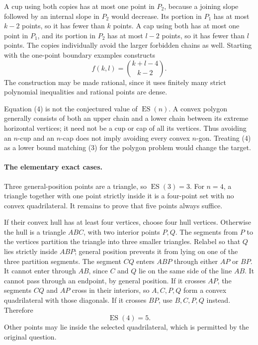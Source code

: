 \documentclass[11pt]{article}
\begin{document}
A cup using both copies has at most one point in $P_2$, because a
joining slope followed by an internal slope in $P_2$ would decrease.
Its portion in $P_1$ has at most $k-2$ points, so it has fewer than $k$
points. A cap using both has at most one point in $P_1$, and its portion
in $P_2$ has at most $l-2$ points, so it has fewer than $l$ points.
The copies individually avoid the larger forbidden chains as well.
Starting with the one-point boundary examples constructs
\[
                         f(k,l)=\binom{k+l-4}{k-2}.      \tag{4}
\]
The construction may be made rational, since it uses finitely many
strict polynomial inequalities and rational points are dense.

Equation (4) is not the conjectured value of $\operatorname{ES}(n)$.
A convex polygon generally consists of both an upper chain and a lower
chain between its extreme horizontal vertices; it need not be a cup
or cap of all its vertices. Thus avoiding an $n$-cup and an $n$-cap
does not imply avoiding every convex $n$-gon. Treating (4) as a lower
bound matching (3) for the polygon problem would change the target.

\paragraph{The elementary exact cases.}
Three general-position points are a triangle, so $\operatorname{ES}(3)=3$.
For $n=4$, a triangle together with one point strictly inside it is a
four-point set with no convex quadrilateral. It remains to prove that
five points always suffice.

If their convex hull has at least four vertices, choose four hull
vertices. Otherwise the hull is a triangle $ABC$, with two interior
points $P,Q$. The segments from $P$ to the vertices partition the
triangle into three smaller triangles. Relabel so that $Q$ lies
strictly inside $ABP$; general position prevents it from lying on one
of the three partition segments. The segment $CQ$ enters $ABP$
through either $AP$ or $BP$. It cannot enter through $AB$, since
$C$ and $Q$ lie on the same side of the line $AB$.
It cannot pass through an endpoint, by general position.
If it crosses $AP$, the segments $CQ$ and $AP$ cross in their
interiors, so $A,C,P,Q$ form a convex quadrilateral with those diagonals.
If it crosses $BP$, use $B,C,P,Q$ instead. Therefore
\[
                              \operatorname{ES}(4)=5.   \tag{5}
\]
Other points may lie inside the selected quadrilateral, which is
permitted by the original question.
\end{document}
